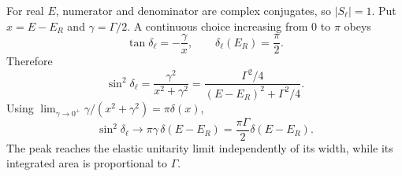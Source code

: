 \begin{enumerate}
For real \(E\), numerator and denominator are complex conjugates, so
\(|S_\ell|=1\).  Put \(x=E-E_R\) and \(\gamma=\Gamma/2\).  A continuous
choice increasing from \(0\) to \(\pi\) obeys
\[
 \tan\delta_\ell=-\frac{\gamma}{x},
\qquad
 \delta_\ell(E_R)=\frac{\pi}{2}.
\]
Therefore
\[
 \sin^2\delta_\ell
 =\frac{\gamma^2}{x^2+\gamma^2}
 =\frac{\Gamma^2/4}
 {(E-E_R)^2+\Gamma^2/4}.
\]
Using
\(\lim_{\gamma\to0^+}\gamma/(x^2+\gamma^2)=\pi\delta(x)\),
\[
 \sin^2\delta_\ell
 \longrightarrow\pi\gamma\,\delta(E-E_R)
 =\frac{\pi\Gamma}{2}\delta(E-E_R).
\]
The peak reaches the elastic unitarity limit independently of its width,
while its integrated area is proportional to \(\Gamma\).
\end{enumerate}

